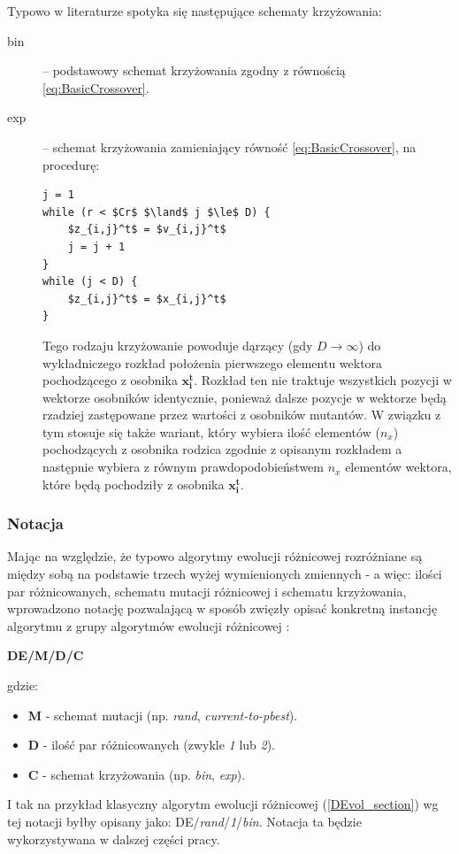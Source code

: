 \documentclass[12pt,a4paper]{report}
\begin{document}
{{{\par{
Typowo w literaturze spotyka się następujące schematy krzyżowania:
\begin{description}
\item[bin] -- podstawowy schemat krzyżowania zgodny z równością \ref{eq:BasicCrossover}.
\item[exp] -- schemat krzyżowania zamieniający równość \ref{eq:BasicCrossover}, na procedurę:
\lstset{language=C}
\begin{lstlisting}[frame=single,mathescape]
j = 1
while (r < $Cr$ $\land$ j $\le$ D) {
	$z_{i,j}^t$ = $v_{i,j}^t$
	j = j + 1
}
while (j < D) {
	$z_{i,j}^t$ = $x_{i,j}^t$
}
\end{lstlisting}
Tego rodzaju krzyżowanie powoduje dąrzący (gdy $D \rightarrow \infty$) do wykładniczego rozkład położenia pierwszego elementu wektora pochodzącego z osobnika $\mathbf{x_i^t}$. Rozkład ten nie traktuje wszystkich pozycji w wektorze osobników identycznie, ponieważ dalsze pozycje w wektorze będą rzadziej zastępowane przez wartości z osobników mutantów. W związku z tym stosuje się także wariant, który wybiera ilość elementów ($n_x$) pochodzących z osobnika rodzica zgodnie z opisanym rozkładem a następnie wybiera z równym prawdopodobieństwem $n_x$ elementów wektora, które będą pochodziły z osobnika $\mathbf{x_i^t}$.
\end{description}
}
\subsubsection{Notacja}
\par{
Mając na względzie, że typowo algorytmy ewolucji różnicowej rozróżniane są między sobą na podstawie trzech wyżej wymienionych zmiennych - a więc: ilości par różnicowanych, schematu mutacji różnicowej i schematu krzyżowania, wprowadzono notację pozwalającą w sposób zwięzły opisać konkretną instancję algorytmu z grupy algorytmów ewolucji różnicowej \cite{PracticalInsights}:
\begin{center}
\textbf{DE/M/D/C}
\end{center}
gdzie:
\begin{itemize}
\item \textbf{M} - schemat mutacji (np. \emph{rand}, \emph{current-to-pbest}).
\item \textbf{D} - ilość par różnicowanych (zwykle \emph{1} lub \emph{2}).
\item \textbf{C} - schemat krzyżowania (np. \emph{bin}, \emph{exp}).
\end{itemize}
I tak na przykład klasyczny algorytm ewolucji różnicowej (\ref{DEvol_section}) wg tej notacji byłby opisany jako: DE/\emph{rand}/\emph{1}/\emph{bin}. Notacja ta będzie wykorzystywana w dalszej części pracy.
}


}}}
\end{document}
